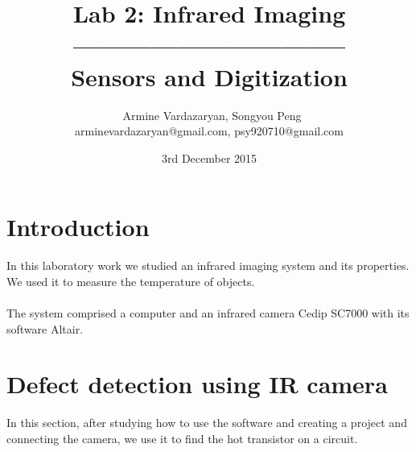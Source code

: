 \documentclass[english]{article}
\begin{document}
\title{Lab 2: Infrared Imaging\\ -------------------------------- \\ \Large Sensors and Digitization}
\author{ \ Armine Vardazaryan, Songyou Peng \\ arminevardazaryan@gmail.com, psy920710@gmail.com}
\date{3rd December 2015}

\maketitle

\section{Introduction}
In this laboratory work we studied an infrared imaging system and its properties. 
We used it to measure the temperature of objects. \\
\\
The system comprised a computer and an infrared camera Cedip SC7000 with its software Altair.
\section{Defect detection using IR camera}
In this section, after studying how to use the software and creating a project and connecting the camera, we use it to find the hot transistor on a circuit.\\
\end{document}
